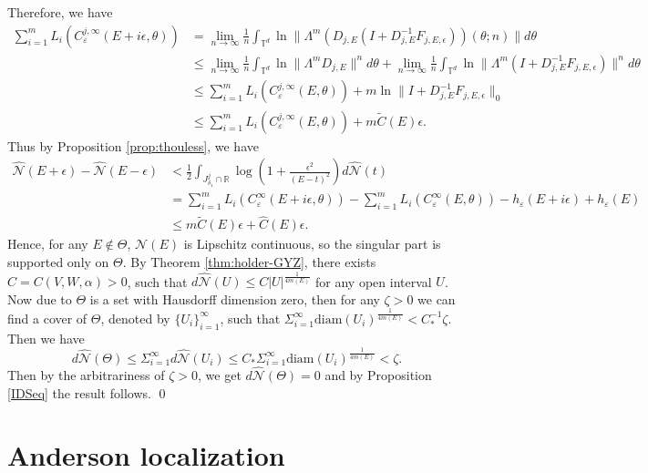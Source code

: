 \documentclass[reqno,11pt]{amsart}
\newcommand{\R}{{\mathbb R}}
\newcommand{\T}{{\mathbb T}}
\begin{document}
 Therefore, we have  
\begin{align*}
\sum_{i=1}^mL_i(C_{\varepsilon}^{j,\infty}(E+i\epsilon,\theta))&=\lim_{n\rightarrow\infty}\frac{1}{n}\int_{\T^d}\ln\|\Lambda^{m}(D_{j,E}(I+D_{j,E}^{-1} F_{j,E,\epsilon}))(\theta;n)\|d\theta \\
&\leq\lim_{n\rightarrow\infty}\frac{1}{n}\int_{\T^d}\ln\|\Lambda^{m}D_{j,E}\|^{n}d\theta+
\lim_{n\rightarrow\infty}\frac{1}{n}\int_{\T^d}\ln\|\Lambda^{m}(I+D_{j,E}^{-1}F_{j,E,\epsilon})\|^{n}d\theta\\
&\leq\sum_{i=1}^mL_i(C_{\varepsilon}^{j,\infty}(E,\theta))+m\ln\|I+D_{j,E}^{-1}F_{j,E,\epsilon}\|_{0}\\
&\leq \sum_{i=1}^mL_i(C_{\varepsilon}^{j,\infty}(E,\theta))+m\tilde C(E)\epsilon.
\end{align*}
Thus by  Proposition \ref{prop:thouless}, we have
$$
\begin{aligned}
   {\widehat{\mathcal{N}}}(E+\epsilon)-{\widehat{\mathcal{N}}}(E-\epsilon)&<\frac{1}{2}\int_{J^j_{\delta_1}\cap\R} \log(1+\frac{\epsilon^{2}}{(E-t)^{2}})d {\widehat{\mathcal{N}}}(t)\\
    &=\sum_{i=1}^mL_i(C_{\varepsilon}^{\infty}(E+i\epsilon,\theta))-\sum_{i=1}^mL_i(C_{\varepsilon}^{\infty}(E,\theta))-h_\varepsilon(E+i\epsilon)+h_\varepsilon(E)\\
    &\leq m\tilde C(E)\epsilon +\hat{C}(E)\epsilon.
\end{aligned}
$$
Hence,  for any $E\notin\Theta$, $\mathcal {N}(E)$ is Lipschitz continuous, so the singular part is supported  only  on $\Theta$.  By Theorem \ref{thm:holder-GYZ}, there exists $C=C(V,W,\alpha)>0$, such that  $d{\widehat{\mathcal{N}}}(U)\leq C|U|^{\frac{1}{4m(E)}}$ for any open interval $U$. 
Now due to $\Theta$ is a set with Hausdorff  dimension zero, then  for any $\zeta>0$ we can find  a cover of $\Theta$, denoted by $\{U_{i}\}_{i=1}^{\infty}$, such that
$\Sigma_{i=1}^\infty\textrm{diam} (U_i)^{\frac{1}{4m(E)}}<C_*^{-1}\zeta.$
Then we have
$$
d\widehat{\mathcal {N}}(\Theta)\leq\Sigma_{i=1}^\infty d{\widehat{\mathcal{N}}}(U_{i})\leq C_*\Sigma_{i=1}^\infty\textrm{diam}(U_i)^{\frac{1}{4m(E)}}<\zeta.
$$
Then by the arbitrariness of $\zeta>0$, we get $d\widehat{\mathcal{N}}(\Theta)=0$ and by Proposition \ref{IDSeq} the result follows. \qed






\section{Anderson localization}
\end{document}
